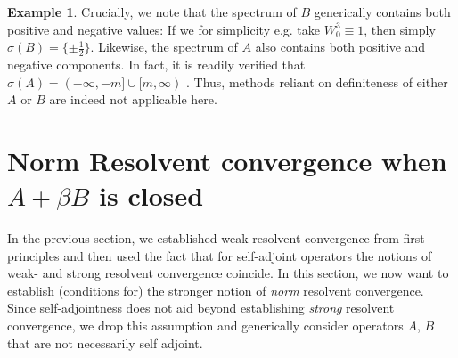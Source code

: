 \documentclass[reqno,12pt,letterpaper]{amsart}
\numberwithin{equation}{section}
\newcommand{\1}{\mathds{1}}
\theoremstyle{definition}
\newtheorem{Ex}[Th]{Example}
\begin{document}
\begin{Ex}
	\medskip
	
	Crucially, we note that the spectrum of \(B\) generically contains both positive and negative values: If we for simplicity e.g. take \(W_0^3 \equiv 1\), then simply \(\sigma(B) = \{\pm \tfrac{1}{2}\}\). Likewise, the spectrum of \(A\) also contains both positive and negative components. In fact, it is readily verified that
$
	\sigma(A) = (-\infty, -m] \cup [m, \infty) 
$ \cite{Thaller1992}.
	Thus,  methods reliant on definiteness of either \(A\) or \(B\) are indeed not applicable here.
	
\end{Ex}


\section{Norm Resolvent convergence when $A + \beta B$ is closed}\label{norm_resolvent_convergence}



\noindent 
In the previous section, we established weak resolvent convergence from first principles and then used the fact that for self-adjoint operators the notions of weak- and strong resolvent convergence coincide. 
In this section, we now want to establish (conditions for) the stronger notion of \emph{norm} resolvent convergence. Since self-adjointness does not aid beyond establishing \emph{strong} resolvent convergence, we drop this assumption and generically consider operators $A$, $B$ that are not necessarily self adjoint.


\medskip 
\end{document}
